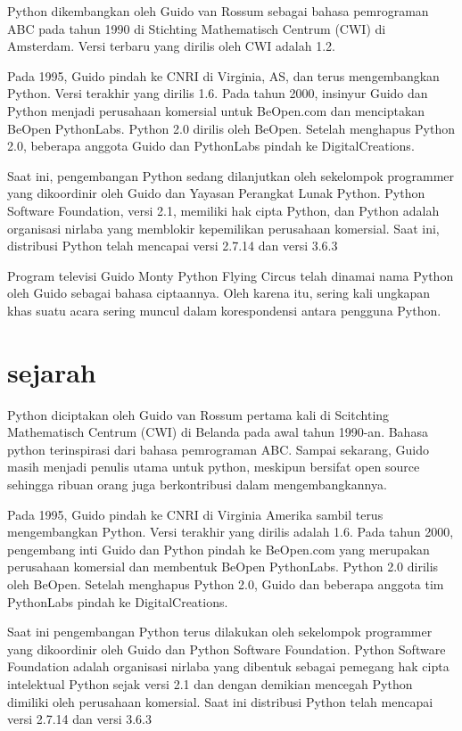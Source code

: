 Python dikembangkan oleh Guido van Rossum sebagai bahasa pemrograman ABC pada tahun 1990 di Stichting Mathematisch Centrum (CWI) di Amsterdam. Versi terbaru yang dirilis oleh CWI adalah 1.2.

Pada 1995, Guido pindah ke CNRI di Virginia, AS, dan terus mengembangkan Python. Versi terakhir yang dirilis 1.6. Pada tahun 2000, insinyur Guido dan Python menjadi perusahaan komersial untuk BeOpen.com dan menciptakan BeOpen PythonLabs. Python 2.0 dirilis oleh BeOpen. Setelah menghapus Python 2.0, beberapa anggota Guido dan PythonLabs pindah ke DigitalCreations.

Saat ini, pengembangan Python sedang dilanjutkan oleh sekelompok programmer yang dikoordinir oleh Guido dan Yayasan Perangkat Lunak Python. Python Software Foundation, versi 2.1, memiliki hak cipta Python, dan Python adalah organisasi nirlaba yang memblokir kepemilikan perusahaan komersial. Saat ini, distribusi Python telah mencapai versi 2.7.14 dan versi 3.6.3

Program televisi Guido Monty Python Flying Circus telah dinamai nama Python oleh Guido sebagai bahasa ciptaannya. Oleh karena itu, sering kali ungkapan khas suatu acara sering muncul dalam korespondensi antara pengguna Python.

\section{sejarah}
Python diciptakan oleh Guido van Rossum pertama kali di Scitchting Mathematisch Centrum (CWI) di Belanda pada awal tahun 1990-an. Bahasa python terinspirasi dari bahasa pemrograman ABC. Sampai sekarang, Guido masih menjadi penulis utama untuk python, meskipun bersifat open source sehingga ribuan orang juga berkontribusi dalam mengembangkannya.

Pada 1995, Guido pindah ke CNRI di Virginia Amerika sambil terus mengembangkan Python. Versi terakhir yang dirilis adalah 1.6. Pada tahun 2000, pengembang inti Guido dan Python pindah ke BeOpen.com yang merupakan perusahaan komersial dan membentuk BeOpen PythonLabs. Python 2.0 dirilis oleh BeOpen. Setelah menghapus Python 2.0, Guido dan beberapa anggota tim PythonLabs pindah ke DigitalCreations.

Saat ini pengembangan Python terus dilakukan oleh sekelompok programmer yang dikoordinir oleh Guido dan Python Software Foundation. Python Software Foundation adalah organisasi nirlaba yang dibentuk sebagai pemegang hak cipta intelektual Python sejak versi 2.1 dan dengan demikian mencegah Python dimiliki oleh perusahaan komersial. Saat ini distribusi Python telah mencapai versi 2.7.14 dan versi 3.6.3

